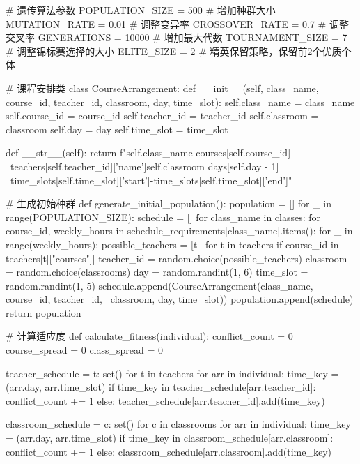 \documentclass{ctexart}
\begin{document}
\begin{pythoncode}
	# 遗传算法参数
	POPULATION_SIZE = 500  # 增加种群大小
	MUTATION_RATE = 0.01  # 调整变异率
	CROSSOVER_RATE = 0.7  # 调整交叉率
	GENERATIONS = 10000  # 增加最大代数
	TOURNAMENT_SIZE = 7  # 调整锦标赛选择的大小
	ELITE_SIZE = 2  # 精英保留策略，保留前2个优质个体
	
	
	# 课程安排类
	class CourseArrangement:
	    def __init__(self, class_name, course_id, teacher_id, classroom, day, time_slot):
	        self.class_name = class_name
	        self.course_id = course_id
	        self.teacher_id = teacher_id
	        self.classroom = classroom
	        self.day = day
	        self.time_slot = time_slot
	
	    def __str__(self):
	        return f"{self.class_name} {courses[self.course_id]} \
		        {teachers[self.teacher_id]['name']}{self.classroom} {days[self.day - 1]} \
		        {time_slots[self.time_slot]['start']}-{time_slots[self.time_slot]['end']}"
	
	
	# 生成初始种群
	def generate_initial_population():
	    population = []
	    for _ in range(POPULATION_SIZE):
	        schedule = []
	        for class_name in classes:
	            for course_id, weekly_hours in schedule_requirements[class_name].items():
	                for _ in range(weekly_hours):
	                    possible_teachers = [t \
	                    for t in teachers if course_id in teachers[t]["courses"]]
	                    teacher_id = random.choice(possible_teachers)
	                    classroom = random.choice(classrooms)
	                    day = random.randint(1, 6)
	                    time_slot = random.randint(1, 5)
	                    schedule.append(CourseArrangement(class_name, course_id, teacher_id, \
	                                                      classroom, day, time_slot))
	        population.append(schedule)
	    return population
	
	
	# 计算适应度
	def calculate_fitness(individual):
	    conflict_count = 0
	    course_spread = 0
	    class_spread = 0
	
	    teacher_schedule = {t: set() for t in teachers}
	    for arr in individual:
	        time_key = (arr.day, arr.time_slot)
	        if time_key in teacher_schedule[arr.teacher_id]:
	            conflict_count += 1
	        else:
	            teacher_schedule[arr.teacher_id].add(time_key)
	
	    classroom_schedule = {c: set() for c in classrooms}
	    for arr in individual:
	        time_key = (arr.day, arr.time_slot)
	        if time_key in classroom_schedule[arr.classroom]:
	            conflict_count += 1
	        else:
	            classroom_schedule[arr.classroom].add(time_key)
	

\end{pythoncode}
\end{document}
